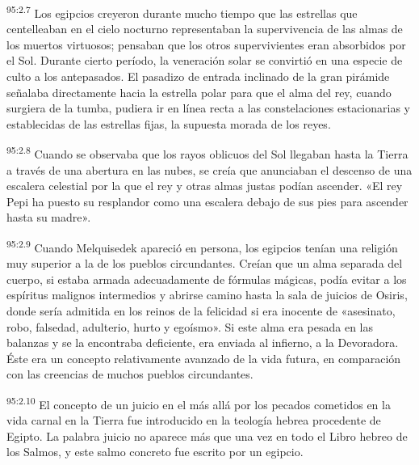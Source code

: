 \par
\textsuperscript{95:2.7} Los egipcios creyeron durante mucho tiempo que las estrellas que centelleaban en el cielo nocturno representaban la supervivencia de las almas de los muertos virtuosos; pensaban que los otros supervivientes eran absorbidos por el Sol. Durante cierto período, la veneración solar se convirtió en una especie de culto a los antepasados. El pasadizo de entrada inclinado de la gran pirámide señalaba directamente hacia la estrella polar para que el alma del rey, cuando surgiera de la tumba, pudiera ir en línea recta a las constelaciones estacionarias y establecidas de las estrellas fijas, la supuesta morada de los reyes.

\par
\textsuperscript{95:2.8} Cuando se observaba que los rayos oblicuos del Sol llegaban hasta la Tierra a través de una abertura en las nubes, se creía que anunciaban el descenso de una escalera celestial por la que el rey y otras almas justas podían ascender. «El rey Pepi ha puesto su resplandor como una escalera debajo de sus pies para ascender hasta su madre».

\par
\textsuperscript{95:2.9} Cuando Melquisedek apareció en persona, los egipcios tenían una religión muy superior a la de los pueblos circundantes. Creían que un alma separada del cuerpo, si estaba armada adecuadamente de fórmulas mágicas, podía evitar a los espíritus malignos intermedios y abrirse camino hasta la sala de juicios de Osiris, donde sería admitida en los reinos de la felicidad si era inocente de «asesinato, robo, falsedad, adulterio, hurto y egoísmo». Si este alma era pesada en las balanzas y se la encontraba deficiente, era enviada al infierno, a la Devoradora. Éste era un concepto relativamente avanzado de la vida futura, en comparación con las creencias de muchos pueblos circundantes.

\par
\textsuperscript{95:2.10} El concepto de un juicio en el más allá por los pecados cometidos en la vida carnal en la Tierra fue introducido en la teología hebrea procedente de Egipto. La palabra juicio no aparece más que una vez en todo el Libro hebreo de los Salmos, y este salmo concreto fue escrito por un egipcio.

